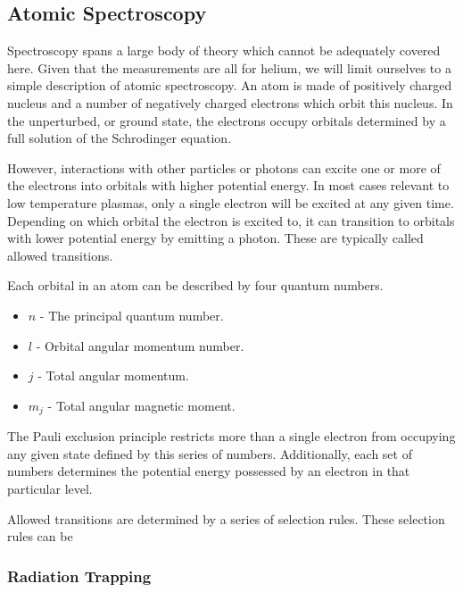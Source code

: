 \subsection{Atomic Spectroscopy}

Spectroscopy spans a large body of theory which cannot be adequately
covered here. Given that the measurements are all for helium, we will
limit ourselves to a simple description of atomic spectroscopy. An atom
is made of positively charged nucleus and a number of negatively charged
electrons which orbit this nucleus. In the unperturbed, or ground state,
the electrons occupy orbitals determined by a full solution of the
Schrodinger equation.

However, interactions with other particles or photons can excite one or
more of the electrons into orbitals with higher potential energy. In
most cases relevant to low temperature plasmas, only a single electron
will be excited at any given time. Depending on which orbital the
electron is excited to, it can transition to orbitals with lower
potential energy by emitting a photon. These are typically called
allowed transitions.

Each orbital in an atom can be described by four quantum numbers.
\begin{itemize}
  \item $n$ - The principal quantum number.
  \item $l$ - Orbital angular momentum number.
  \item $j$ - Total angular momentum.
  \item $m_j$ - Total angular magnetic moment.
\end{itemize}
The Pauli exclusion principle restricts more than a single electron from
occupying any given state defined by this series of numbers.
Additionally, each set of numbers determines the potential energy
possessed by an electron in that particular level. 

Allowed transitions are determined by a series of selection rules. These
selection rules can be 


\subsubsection{Radiation Trapping}
